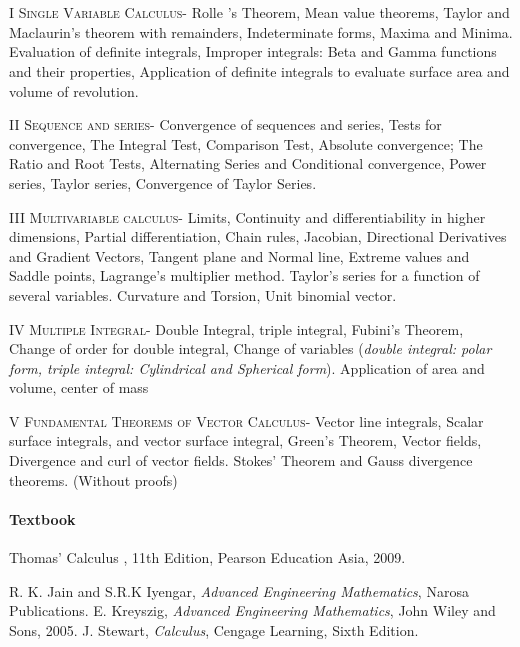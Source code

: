 
\section{\courseinfo}
\unit{I} \textsc{Single Variable Calculus-}
Rolle ’s Theorem, Mean value theorems, Taylor and Maclaurin's theorem with remainders, Indeterminate forms, Maxima and Minima. Evaluation of definite integrals, Improper integrals: Beta and Gamma functions and their properties, Application of definite integrals to evaluate surface area and volume of revolution. 

\unit{II}
\textsc{Sequence and series-}
Convergence of sequences and series, Tests for convergence, The Integral Test, Comparison Test, Absolute convergence; The Ratio and Root Tests, Alternating Series and Conditional convergence, Power series, Taylor series, Convergence of Taylor Series.

\unit{III} 
\textsc{Multivariable calculus-}
Limits, Continuity and differentiability in higher dimensions, Partial differentiation, Chain rules, Jacobian, Directional Derivatives and Gradient Vectors, Tangent plane and Normal line, Extreme values and Saddle points, Lagrange's multiplier method.  Taylor's series for a function of several variables. Curvature and Torsion, Unit binomial vector.

\unit{IV} \textsc{Multiple Integral-}
Double Integral, triple integral, Fubini's Theorem, Change of order for double integral, Change of variables (\emph{double integral: polar form, triple integral: Cylindrical and Spherical form}). Application of area and volume, center of mass

\unit{V} 
\textsc{Fundamental Theorems of Vector Calculus-}
Vector line integrals, Scalar surface integrals, and vector surface integral, Green's Theorem, 
Vector fields, Divergence and curl of vector fields.
Stokes' Theorem and Gauss divergence theorems. (Without proofs)
\nocite{}
\paragraph{Textbook}
Thomas' Calculus , 11th Edition, Pearson Education Asia, 2009.

\begin{thebibliography}{}
{} R. K. Jain and S.R.K Iyengar, \emph{Advanced Engineering Mathematics}, Narosa Publications.
 E. Kreyszig, \emph{Advanced Engineering Mathematics}, John Wiley and Sons, 2005.
 J. Stewart, \emph{Calculus}, Cengage Learning, Sixth Edition.

\end{thebibliography}














